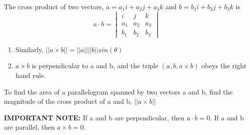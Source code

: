 \documentclass[12pt, letterpaper]{article}
\begin{document}
The cross product of two vectors, \(a = a_1i + a_2j + a_3k\) and \(b = b_1i + b_2j + b_3k\) is 
\[
a \cdot b =
\begin{vmatrix}
i & j & k\\
a_{1} & a_{2} & a_{3}\\
b_{1} & b_{2} & b_{3}
\end{vmatrix}
\]
\begin{enumerate}
    \item Similarly, \(||a \times b|| = ||a||||b||sin(\theta)\)
    \item \(a \times b\) is perpendicular to a and b, and the triple \((a, b, a \times b)\) obeys the right hand rule.
\end{enumerate}
To find the area of a parallelogram spanned by two vectors a and b, find the magnitude of the cross product of a and b, \(||a \times b||\)

\textbf{IMPORTANT NOTE: }If a and b are perpendicular, then \(a \cdot b = 0\). If a and b are parallel, then \(a \times b = 0\).
\end{document}
